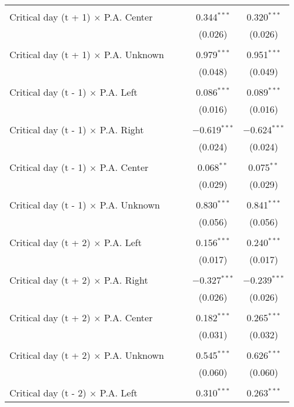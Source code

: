 \documentclass[
]{article}
\begin{document}
\begin{table}[!htbp]
{\begin{tabular}{@{\extracolsep{5pt}}lcccc}
  & & & & \\ 
 Critical day (t + 1) $\times$ P.A. Center &  &  & 0.344$^{***}$ & 0.320$^{***}$ \\ 
  &  &  & (0.026) & (0.026) \\ 
  & & & & \\ 
 Critical day (t + 1) $\times$ P.A. Unknown &  &  & 0.979$^{***}$ & 0.951$^{***}$ \\ 
  &  &  & (0.048) & (0.049) \\ 
  & & & & \\ 
 Critical day (t - 1) $\times$ P.A. Left &  &  & 0.086$^{***}$ & 0.089$^{***}$ \\ 
  &  &  & (0.016) & (0.016) \\ 
  & & & & \\ 
 Critical day (t - 1) $\times$ P.A. Right &  &  & $-$0.619$^{***}$ & $-$0.624$^{***}$ \\ 
  &  &  & (0.024) & (0.024) \\ 
  & & & & \\ 
 Critical day (t - 1) $\times$ P.A. Center &  &  & 0.068$^{**}$ & 0.075$^{**}$ \\ 
  &  &  & (0.029) & (0.029) \\ 
  & & & & \\ 
 Critical day (t - 1) $\times$ P.A. Unknown &  &  & 0.830$^{***}$ & 0.841$^{***}$ \\ 
  &  &  & (0.056) & (0.056) \\ 
  & & & & \\ 
 Critical day (t + 2) $\times$ P.A. Left &  &  & 0.156$^{***}$ & 0.240$^{***}$ \\ 
  &  &  & (0.017) & (0.017) \\ 
  & & & & \\ 
 Critical day (t + 2) $\times$ P.A. Right &  &  & $-$0.327$^{***}$ & $-$0.239$^{***}$ \\ 
  &  &  & (0.026) & (0.026) \\ 
  & & & & \\ 
 Critical day (t + 2) $\times$ P.A. Center &  &  & 0.182$^{***}$ & 0.265$^{***}$ \\ 
  &  &  & (0.031) & (0.032) \\ 
  & & & & \\ 
 Critical day (t + 2) $\times$ P.A. Unknown &  &  & 0.545$^{***}$ & 0.626$^{***}$ \\ 
  &  &  & (0.060) & (0.060) \\ 
  & & & & \\ 
 Critical day (t - 2) $\times$ P.A. Left &  &  & 0.310$^{***}$ & 0.263$^{***}$ \\ 

\end{tabular}}
\end{table}
\end{document}
